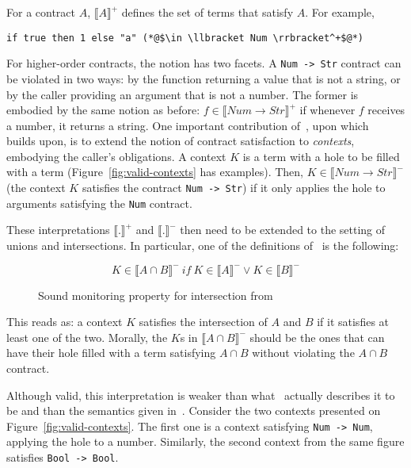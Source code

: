 \documentclass[sigplan,10pt,review,anonymous]{acmart}
\newcommand{\nickel}[1]{\lstinline[language=nickel]{#1}}
\begin{document}
For a contract $A$, $\llbracket A \rrbracket^+$ defines the set of terms that
satisfy $A$. For example,

\begin{lstlisting}[language=nickel,frame=none,numbers=none]
    if true then 1 else "a" (*@$\in \llbracket Num \rrbracket^+$@*)
\end{lstlisting}

For higher-order contracts, the notion has two facets. A \nickel{Num -> Str}
contract can be violated in two ways: by the function returning a value that is
not a string, or by the caller providing an argument that is not a number.  The
former is embodied by the same notion as before: $f \in \llbracket Num \to Str
\rrbracket^+$ if whenever $f$ receives a number, it returns a string.  One
important contribution of~\cite{KeilThiemannUnionIntersection}, upon
which~\cite{RootCauseOfBlame} builds upon, is to extend the notion of contract
satisfaction to \emph{contexts}, embodying the caller's
obligations. A context $K$ is a term with a hole to be filled with a term (Figure~\ref{fig:valid-contexts} has examples). Then, $K \in \llbracket Num \to
Str \rrbracket^-$ (the context $K$ satisfies the contract \nickel{Num -> Str})
if it only applies the hole to arguments satisfying the \nickel{Num} contract.

These interpretations $\llbracket . \rrbracket^+$ and $\llbracket .
\rrbracket^-$ then need to be extended to the setting of unions and
intersections. In particular, one of the definitions of~\cite{RootCauseOfBlame}
is the following:

\begin{figure}[h]
$$ K \in \llbracket A \cap B \rrbracket^-~if~K \in \llbracket A \rrbracket^- \lor K \in \llbracket B \rrbracket^- $$
\caption{Sound monitoring property for intersection from~\cite{RootCauseOfBlame}}
\label{fig:wmw-semantics}
\end{figure}

This reads as: a context $K$ satisfies the intersection of $A$ and $B$ if it
satisfies at least one of the two. Morally, the $K$s in $\llbracket A \cap B
\rrbracket^-$  should be the ones that can have their hole filled with a term
satisfying $A \cap B$ without violating the $A \cap B$ contract.

Although valid, this interpretation is weaker than what~\cite{RootCauseOfBlame}
actually describes it to be and than the semantics given
in~\cite{KeilThiemannUnionIntersection}. Consider the two contexts presented on
Figure~\ref{fig:valid-contexts}. The first one is a context satisfying
\nickel{Num -> Num}, applying the hole to a number. Similarly, the second context
from the same figure satisfies \nickel{Bool -> Bool}.
\end{document}
